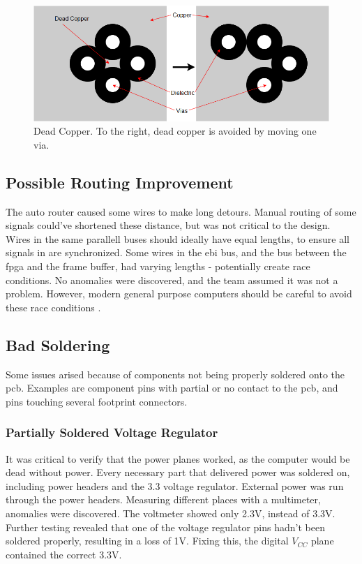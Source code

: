 \begin{figure}[h!]
\centering
\includegraphics[scale = 0.4]{images/Dead_Copper.png}
\caption{Dead Copper. To the right, dead copper is avoided by moving one via.}
\label{fig:Dead copper}
\end{figure}

\subsection{Possible Routing Improvement}
The auto router caused some wires to make long detours.
Manual routing of some signals could've shortened these distance, but was not critical to the design.
Wires in the same parallell buses should ideally have equal lengths, to ensure all signals in are synchronized.
Some wires in the \gls{ebi} bus, and the bus between the \gls{fpga} and the frame buffer, had varying lengths - potentially create race conditions.
No anomalies were discovered, and the team assumed it was not a problem.
However, modern general purpose computers should be careful to avoid these race conditions \cite{race-conditions}.

\subsection{Bad Soldering}
Some issues arised because of components not being properly soldered onto the \gls{pcb}. Examples are component pins with partial or no contact to the \gls{pcb}, and pins touching several footprint connectors.

\subsubsection{Partially Soldered Voltage Regulator}
It was critical to verify that the power planes worked, as the computer would be dead without power.
Every necessary part that delivered power was soldered on, including power headers and the 3.3 voltage regulator.
External power was run through the power headers.
Measuring different places with a multimeter, anomalies were discovered.
The voltmeter showed only 2.3V, instead of 3.3V.
Further testing revealed that one of the voltage regulator pins hadn't been soldered properly, resulting in a loss of 1V.
Fixing this, the digital \(V_{CC}\) plane contained the correct 3.3V.

